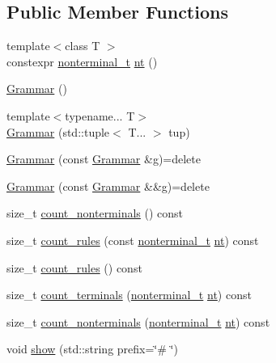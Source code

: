 \subsection*{Public Member Functions}
\begin{DoxyCompactItemize}
\item 
{\footnotesize template$<$class T $>$ }\\constexpr \hyperlink{_nonterminal_8h_a5c1f658dc7560600a16d22408bd716ca}{nonterminal\+\_\+t} \hyperlink{class_grammar_a047b55bfbd87c52e9d969af62c2932ab}{nt} ()
\item 
\hyperlink{class_grammar_a2fa1d41e021616790a5ec8f4b3de9b08}{Grammar} ()
\item 
{\footnotesize template$<$typename... T$>$ }\\\hyperlink{class_grammar_a7db6840d96e910a788968ebb2fe62df4}{Grammar} (std\+::tuple$<$ T... $>$ tup)
\item 
\hyperlink{class_grammar_a70df918794a43cbd26bae1096c92dead}{Grammar} (const \hyperlink{class_grammar}{Grammar} \&g)=delete
\item 
\hyperlink{class_grammar_a008b2bd47d150afe8ab304e6d213f0ba}{Grammar} (const \hyperlink{class_grammar}{Grammar} \&\&g)=delete
\item 
size\+\_\+t \hyperlink{class_grammar_a4aa05c747026932672a24fa1f7134115}{count\+\_\+nonterminals} () const
\item 
size\+\_\+t \hyperlink{class_grammar_a90a765c97b89f2f4cf12b6b4c2a3d019}{count\+\_\+rules} (const \hyperlink{_nonterminal_8h_a5c1f658dc7560600a16d22408bd716ca}{nonterminal\+\_\+t} \hyperlink{class_grammar_a047b55bfbd87c52e9d969af62c2932ab}{nt}) const
\item 
size\+\_\+t \hyperlink{class_grammar_a576605ca6ee9693b762a40c477aa4889}{count\+\_\+rules} () const
\item 
size\+\_\+t \hyperlink{class_grammar_a5121201035b5d5cd0a1d4251b1f73056}{count\+\_\+terminals} (\hyperlink{_nonterminal_8h_a5c1f658dc7560600a16d22408bd716ca}{nonterminal\+\_\+t} \hyperlink{class_grammar_a047b55bfbd87c52e9d969af62c2932ab}{nt}) const
\item 
size\+\_\+t \hyperlink{class_grammar_a335c2679b0db2290a1a0da8910f0bcdd}{count\+\_\+nonterminals} (\hyperlink{_nonterminal_8h_a5c1f658dc7560600a16d22408bd716ca}{nonterminal\+\_\+t} \hyperlink{class_grammar_a047b55bfbd87c52e9d969af62c2932ab}{nt}) const
\item 
void \hyperlink{class_grammar_a8d661258f08b7cc4d154d59bfbbc1f68}{show} (std\+::string prefix=\char`\"{}\# \char`\"{})

\end{DoxyCompactItemize}
